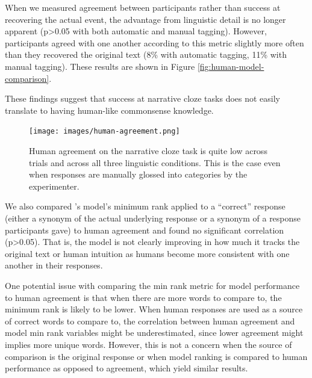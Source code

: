 \documentclass[10pt,a4paper]{article}
\begin{document}
When we measured agreement between participants rather than success at recovering the actual event, the advantage from linguistic detail is no longer apparent (p>0.05 with both automatic and manual tagging). However, participants agreed with one another according to this metric slightly more often than they recovered the original text (8\% with automatic tagging, 11\% with manual tagging). These results are shown in Figure \ref{fig:human-model-comparison}.


These findings suggest that success at narrative cloze tasks does not easily translate to having human-like commonsense knowledge.

\begin{figure}
 \centering
 \texttt{[image: images/human-agreement.png]}
 \caption{Human agreement on the narrative cloze task is quite low across trials and across all three linguistic conditions. This is the case even when responses are manually glossed into categories by the experimenter.}
 \label{fig:human-agreement}
\end{figure}

We also compared 's model's minimum rank applied to a ``correct'' response (either a synonym of the actual underlying response or a synonym of a response participants gave) to human agreement and found no significant correlation (p>0.05). That is, the model is not clearly improving in how much it tracks the original text or human intuition as humans become more consistent with one another in their responses.

One potential issue with comparing the min rank metric for model performance to human agreement is that when there are more words to compare to, the minimum rank is likely to be lower. When human responses are used as a source of correct words to compare to, the correlation between human agreement and model min rank variables might be underestimated, since lower agreement might implies more unique words. However, this is not a concern when the source of comparison is the original response or when model ranking is compared to human performance as opposed to agreement, which yield similar results.
\end{document}
